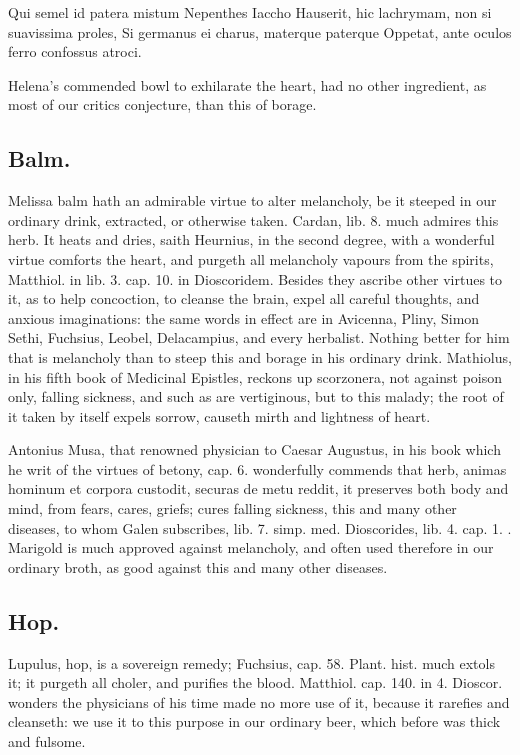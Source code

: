 {Qui semel id patera mistum Nepenthes Iaccho
Hauserit, hic lachrymam, non si suavissima proles,
Si germanus ei charus, materque paterque
Oppetat, ante oculos ferro confossus atroci.

Helena's commended bowl to exhilarate the heart, had no other
ingredient, as most of our critics conjecture, than this of borage.
\subsection{Balm.}
Melissa balm hath an admirable virtue to alter melancholy, be
it steeped in our ordinary drink, extracted, or otherwise taken.
Cardan, lib. 8. much admires this herb. It heats and dries, saith
 Heurnius, in the second degree, with a wonderful virtue comforts
the heart, and purgeth all melancholy vapours from the spirits,
Matthiol. in lib. 3. cap. 10. in Dioscoridem. Besides they ascribe
other virtues to it, as to help concoction, to cleanse the brain,
expel all careful thoughts, and anxious imaginations: the same words in
effect are in Avicenna, Pliny, Simon Sethi, Fuchsius, Leobel,
Delacampius, and every herbalist. Nothing better for him that is
melancholy than to steep this and borage in his ordinary drink.
Mathiolus, in his fifth book of Medicinal Epistles, reckons up
scorzonera, not against poison only, falling sickness, and such
as are vertiginous, but to this malady; the root of it taken by itself
expels sorrow, causeth mirth and lightness of heart.

Antonius Musa, that renowned physician to Caesar Augustus, in his book
which he writ of the virtues of betony, cap. 6. wonderfully commends
that herb, animas hominum et corpora custodit, securas de metu reddit,
it preserves both body and mind, from fears, cares, griefs; cures
falling sickness, this and many other diseases, to whom Galen
subscribes, lib. 7. simp. med. Dioscorides, lib. 4. cap. 1. \etc{}.
Marigold is much approved against melancholy, and often used therefore
in our ordinary broth, as good against this and many other diseases.

\subsection{Hop.}
Lupulus, hop, is a sovereign remedy; Fuchsius, cap. 58. Plant.
hist. much extols it; it purgeth all choler, and purifies the
blood. Matthiol. cap. 140. in 4. Dioscor. wonders the physicians of his
time made no more use of it, because it rarefies and cleanseth: we use
it to this purpose in our ordinary beer, which before was thick and
fulsome.

}

